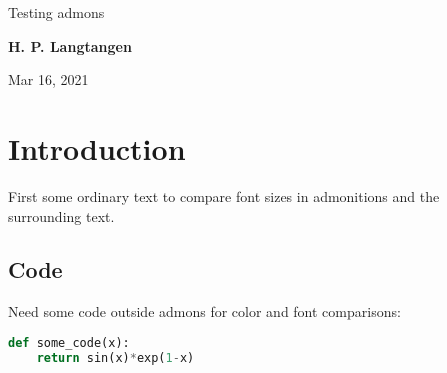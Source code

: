 \documentclass[%
oneside,                 %
final,                   %
10pt]{article}
\begin{document}

\newcommand{\exercisesection}[1]{\subsection*{#1}}








\thispagestyle{empty}

\begin{center}
{\LARGE\bf
\begin{spacing}{1.25}
Testing admons
\end{spacing}
}
\end{center}


\begin{center}
{\bf H. P. Langtangen${}^{}$} \\ [0mm]
\end{center}

\begin{center}
\end{center}
    

\begin{center}
Mar 16, 2021
\end{center}

\vspace{1cm}


\section{Introduction}
First some ordinary text to compare font sizes in admonitions
and the surrounding text.

\subsection{Code}

Need some code outside admons for color and font comparisons:

\begin{lstlisting}[language=Python,style=simple,xleftmargin=2mm]
def some_code(x):
    return sin(x)*exp(1-x)
\end{lstlisting}
\end{document}
